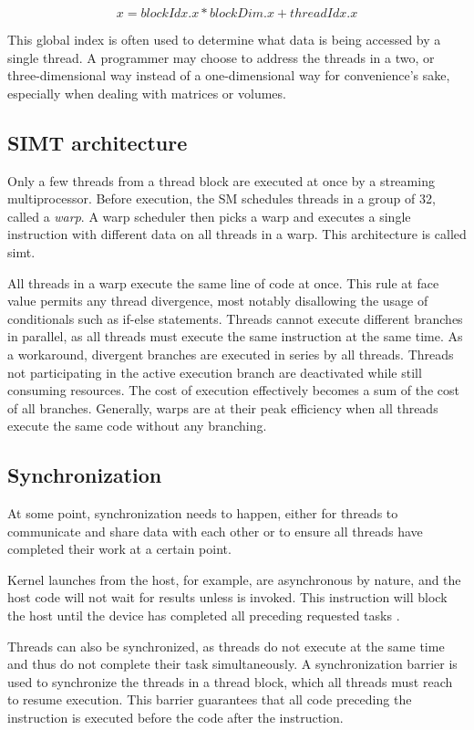 $$x = blockIdx.x * blockDim.x + threadIdx.x$$

This global index is often used to determine what data is being accessed by a single thread. A programmer may choose to address the threads in a two, or three-dimensional way instead of a one-dimensional way for convenience's sake, especially when dealing with matrices or volumes.

\subsection{SIMT architecture}\label{subsection:simt}

Only a few threads from a thread block are executed at once by a streaming multiprocessor. Before execution, the SM schedules threads in a group of 32, called a \textit{warp}. A warp scheduler then picks a warp and executes a single instruction with different data on all threads in a warp. This architecture is called \acrfull{simt}.

All threads in a warp execute the same line of code at once. This rule at face value permits any thread divergence, most notably disallowing the usage of conditionals such as if-else statements. Threads cannot execute different branches in parallel, as all threads must execute the same instruction at the same time. As a workaround, divergent branches are executed in series by all threads. Threads not participating in the active execution branch are deactivated while still consuming resources. The cost of execution effectively becomes a sum of the cost of all branches. Generally, warps are at their peak efficiency when all threads execute the same code without any branching.

\subsection{Synchronization}

At some point, synchronization needs to happen, either for threads to communicate and share data with each other or to ensure all threads have completed their work at a certain point.

Kernel launches from the host, for example, are asynchronous by nature, and the host code will not wait for results unless  is invoked. This instruction will block the host until the device has completed all preceding requested tasks \cite{cudaprog}.

Threads can also be synchronized, as threads do not execute at the same time and thus do not complete their task simultaneously. A synchronization barrier  is used to synchronize the threads in a thread block, which all threads must reach to resume execution. This barrier guarantees that all code preceding the instruction is executed before the code after the instruction.

